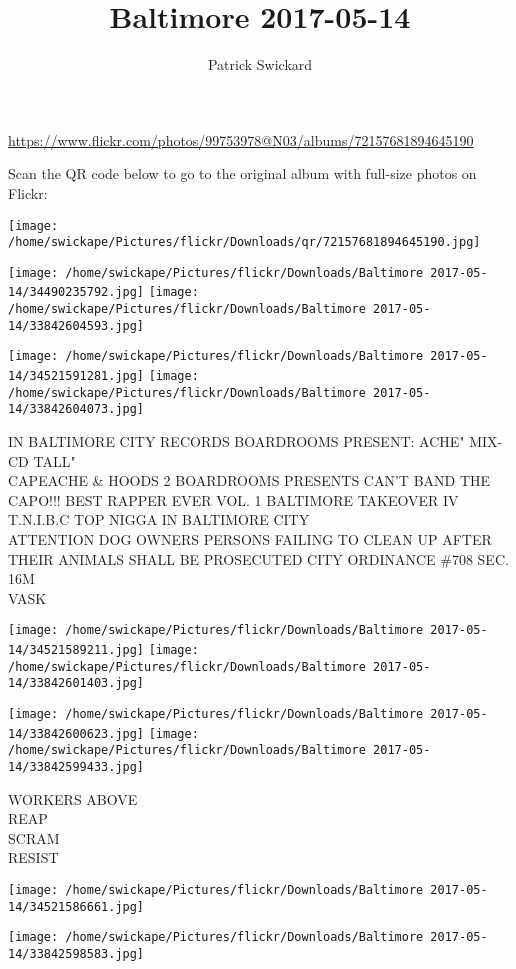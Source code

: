\documentclass[10pt,letterpaper]{article}
\title{Baltimore 2017-05-14}
\author{Patrick Swickard}
\date{}
\begin{document}
\maketitle

\url{https://www.flickr.com/photos/99753978@N03/albums/72157681894645190}

Scan the QR code below to go to the original album with full-size photos on Flickr:

\texttt{[image: /home/swickape/Pictures/flickr/Downloads/qr/72157681894645190.jpg]}
\pagebreak

\texttt{[image: /home/swickape/Pictures/flickr/Downloads/Baltimore 2017-05-14/34490235792.jpg]}
\texttt{[image: /home/swickape/Pictures/flickr/Downloads/Baltimore 2017-05-14/33842604593.jpg]}

\texttt{[image: /home/swickape/Pictures/flickr/Downloads/Baltimore 2017-05-14/34521591281.jpg]}
\texttt{[image: /home/swickape/Pictures/flickr/Downloads/Baltimore 2017-05-14/33842604073.jpg]}

IN BALTIMORE CITY RECORDS BOARDROOMS PRESENT: ACHE" MIX{-}CD TALL"\\
CAPEACHE \& HOODS 2 BOARDROOMS PRESENTS CAN'T BAND THE CAPO!!! BEST RAPPER EVER VOL. 1 BALTIMORE TAKEOVER IV T.N.I.B.C TOP NIGGA IN BALTIMORE CITY\\
ATTENTION DOG OWNERS PERSONS FAILING TO CLEAN UP AFTER THEIR ANIMALS SHALL BE PROSECUTED CITY ORDINANCE \#708 SEC. 16M\\
VASK
\pagebreak

\texttt{[image: /home/swickape/Pictures/flickr/Downloads/Baltimore 2017-05-14/34521589211.jpg]}
\texttt{[image: /home/swickape/Pictures/flickr/Downloads/Baltimore 2017-05-14/33842601403.jpg]}

\texttt{[image: /home/swickape/Pictures/flickr/Downloads/Baltimore 2017-05-14/33842600623.jpg]}
\texttt{[image: /home/swickape/Pictures/flickr/Downloads/Baltimore 2017-05-14/33842599433.jpg]}

WORKERS ABOVE\\
REAP\\
SCRAM\\
RESIST
\pagebreak

\texttt{[image: /home/swickape/Pictures/flickr/Downloads/Baltimore 2017-05-14/34521586661.jpg]}

\vspace{0.25in}
\texttt{[image: /home/swickape/Pictures/flickr/Downloads/Baltimore 2017-05-14/33842598583.jpg]}
\end{document}
